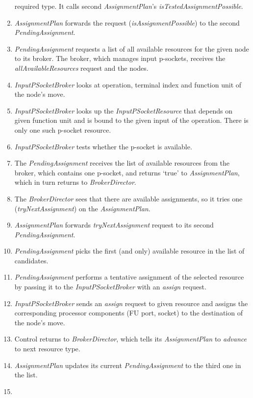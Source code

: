 \documentclass[a4paper,twoside]{tce}
\begin{document}
\begin{enumerate}
  required type. It calls second \emph{AssignmentPlan}'s
  \emph{isTestedAssignmentPossible}.
\item %
  \emph{AssignmentPlan} forwards the request (\emph{isAssignmentPossible})
  to the second \emph{PendingAssignment}.
\item %
  \emph{PendingAssignment} requests a list of all available resources for
  the given node to its broker. The broker, which manages input p-sockets,
  receives the \emph{allAvailableResources} request and the nodes.
\item %
  \emph{InputPSocketBroker} looks at operation, terminal index and function
  unit of the node's move.
\item %
  \emph{InputPSocketBroker} looks up the \emph{InputPSocketResource} that
  depends on given function unit and is bound to the given input of the
  operation. There is only one such p-socket resource.
\item %
  \emph{InputPSocketBroker} tests whether the p-socket is available.
\item %
  The \emph{PendingAssignment} receives the list of available resources from
  the broker, which contains one p-socket, and returns `true' to
  \emph{AssignmentPlan}, which in turn returns to \emph{BrokerDirector}.
\item %
  The \emph{BrokerDirector} sees that there are available assignments, so it
  tries one (\emph{tryNextAssignment}) on the \emph{AssignmentPlan}.
\item %
  \emph{AssignmentPlan} forwards \emph{tryNextAssignment} request to its
  second \emph{PendingAssignment}.
\item %
  \emph{PendingAssignment} picks the first (and only) available resource in
  the list of candidates.
\item %
  \emph{PendingAssignment} performs a tentative assignment of the selected
  resource by passing it to the \emph{InputPSocketBroker} with an
  \emph{assign} request.
\item %
  \emph{InputPSocketBroker} sends an \emph{assign} request to given resource
  and assigns the corresponding processor components (FU port, socket) to
  the destination of the node's move.
\item %
  Control returns to \emph{BrokerDirector}, which tells its
  \emph{AssignmentPlan} to \emph{advance} to next resource type.
\item %
  \emph{AssignmentPlan} updates its current \emph{PendingAssignment} to the
  third one in the list.
\item %

\end{enumerate}
\end{document}
